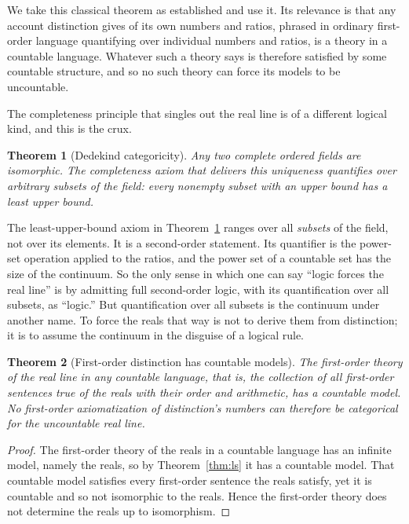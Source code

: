 \documentclass[11pt,a4paper]{article}
\newtheorem{theorem}{Theorem}[section]
\theoremstyle{definition}
\theoremstyle{remark}
\begin{document}
We take this classical theorem as established and use it. Its relevance is that
any account distinction gives of its own numbers and ratios, phrased in ordinary
first-order language quantifying over individual numbers and ratios, is a theory
in a countable language. Whatever such a theory says is therefore satisfied by
some countable structure, and so no such theory can force its models to be
uncountable.

The completeness principle that singles out the real line is of a different
logical kind, and this is the crux.

\begin{theorem}[Dedekind categoricity]\label{thm:dedekind}
Any two complete ordered fields are isomorphic. The completeness axiom that
delivers this uniqueness quantifies over arbitrary subsets of the field: every
nonempty subset with an upper bound has a least upper bound.
\end{theorem}

The least-upper-bound axiom in Theorem~\ref{thm:dedekind} ranges over all
\emph{subsets} of the field, not over its elements. It is a second-order
statement. Its quantifier is the power-set operation applied to the ratios, and
the power set of a countable set has the size of the continuum. So the only sense
in which one can say ``logic forces the real line'' is by admitting full
second-order logic, with its quantification over all subsets, as ``logic.'' But
quantification over all subsets is the continuum under another name. To force the
reals that way is not to derive them from distinction; it is to assume the
continuum in the disguise of a logical rule.

\begin{theorem}[First-order distinction has countable models]\label{thm:fo}
The first-order theory of the real line in any countable language, that is, the
collection of all first-order sentences true of the reals with their order and
arithmetic, has a countable model. No first-order axiomatization of distinction's
numbers can therefore be categorical for the uncountable real line.
\end{theorem}

\begin{proof}
The first-order theory of the reals in a countable language has an infinite
model, namely the reals, so by Theorem~\ref{thm:ls} it has a countable model.
That countable model satisfies every first-order sentence the reals satisfy, yet
it is countable and so not isomorphic to the reals. Hence the first-order theory
does not determine the reals up to isomorphism.
\end{proof}
\end{document}
